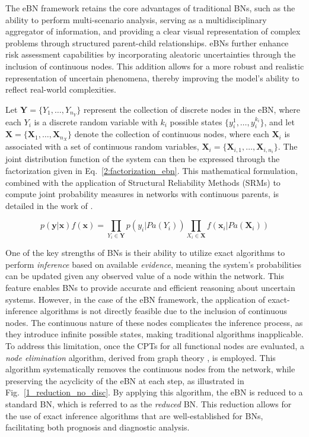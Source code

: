 The eBN framework retains the core advantages of traditional BNs, such as the ability to perform multi-scenario analysis, serving as a multidisciplinary aggregator of information, and providing a clear visual representation of complex problems through structured parent-child relationships. eBNs further enhance risk assessment capabilities by incorporating aleatoric uncertainties through the inclusion of continuous nodes. This addition allows for a more robust and realistic representation of uncertain phenomena, thereby improving the model's ability to reflect real-world complexities.

Let $\mathbf{Y} = \{Y_1, \ldots, Y_{n_Y}\}$ represent the collection of discrete nodes in the eBN, where each $Y_i$ is a discrete random variable with $k_i$ possible states $\{y_i^1, \ldots, y_i^{k_i}\}$, and let $\mathbf{X} = \{\mathbf{X}_1, \ldots, \mathbf{X}_{n_X}\}$ denote the collection of continuous nodes, where each $\mathbf{X}_i$ is associated with a set of continuous random variables, $\mathbf{X}_i = \{\mathbf{X}_{i,1}, \ldots, \mathbf{X}_{i,n_i}\}$. The joint distribution function of the system can then be expressed through the factorization given in Eq.~\ref{2:factorization_ebn}. This mathematical formulation, combined with the application of Structural Reliability Methods (SRMs) to compute joint probability measures in networks with continuous parents, is detailed in the work of \textcite{straub_bayesian_2010}.

\begin{equation}
    \label{2:factorization_ebn}
    p(\mathbf{y}|\mathbf{x})f(\mathbf{x}) = \prod_{Y_i\in \mathbf{Y}} p(y_i|Pa(Y_i)) \prod_{X_i\in \mathbf{X}} f(\mathbf{x}_i|Pa(\mathbf{X}_i)) 
\end{equation}

One of the key strengths of BNs is their ability to utilize exact algorithms to perform \textit{inference} based on available \textit{evidence}, meaning the system's probabilities can be updated given any observed value of a node within the network. This feature enables BNs to provide accurate and efficient reasoning about uncertain systems. However, in the case of the eBN framework, the application of exact-inference algorithms is not directly feasible due to the inclusion of continuous nodes. The continuous nature of these nodes complicates the inference process, as they introduce infinite possible states, making traditional algorithms inapplicable.  
To address this limitation, once the CPTs for all functional nodes are evaluated, a \textit{node elimination} algorithm, derived from graph theory \cite{Shachter86a}, is employed. This algorithm systematically removes the continuous nodes from the network, while preserving the acyclicity of the eBN at each step, as illustrated in Fig.~\ref{1_reduction_no_disc}. By applying this algorithm, the eBN is reduced to a standard BN, which is referred to as the \textit{reduced} BN. This reduction allows for the use of exact inference algorithms that are well-established for BNs, facilitating both prognosis and diagnostic analysis. \\


